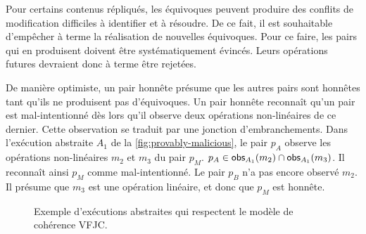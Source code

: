 Pour certains contenus répliqués, les équivoques peuvent produire des conflits de modification difficiles à identifier et à résoudre.
De ce fait, il est souhaitable d'empêcher à terme la réalisation de nouvelles équivoques.
Pour ce faire, les pairs qui en produisent doivent être systématiquement évincés.
Leurs opérations futures devraient donc à terme être rejetées.

De manière optimiste, un pair honnête présume que les autres pairs sont honnêtes tant qu'ils ne produisent pas d'équivoques.
Un pair honnête reconnaît qu'un pair est mal-intentionné dès lors qu'il observe deux opérations non-linéaires de ce dernier.
Cette observation se traduit par une jonction d'embranchements.
Dans l'exécution abstraite $A_1$ de la \autoref{fig:provably-malicious}, le pair $p_A$ observe les opérations non-linéaires $m_2$ et $m_3$ du pair $p_M$. $p_A \in \operatorname{\mathsf{obs}}_{A_1}(m_2) \cap \operatorname{\mathsf{obs}}_{A_1}(m_3)$.
Il reconnaît ainsi $p_M$ comme mal-intentionné.
Le pair $p_B$ n'a pas encore observé $m_2$. Il présume que $m_3$ est une opération linéaire, et donc que $p_M$ est honnête.

\begin{figure}[htb]
\centering
{}
\caption{Exemple d'exécutions abstraites qui respectent le modèle de cohérence \ac{VFJC}.}\label{fig:provably-malicious}
\end{figure}

